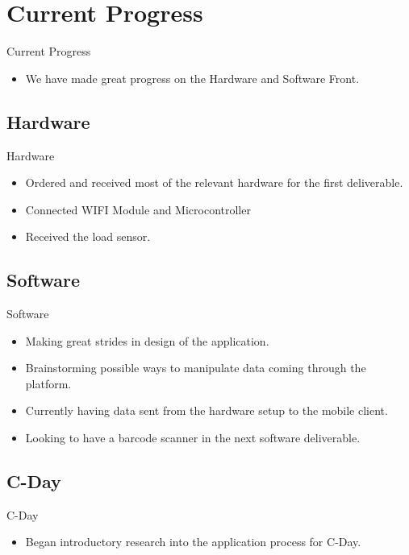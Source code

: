 \documentclass{beamer}
\begin{document}
\section{Current Progress}
\begin{frame}{Current Progress}
\begin{itemize}
	\item<1-> We have made great progress on the Hardware and Software Front.\pause
\end{itemize}
\end{frame}
\subsection{Hardware}
\begin{frame}{Hardware}
\begin{itemize}
	\item<1-> Ordered and received most of the relevant hardware for the first deliverable.\pause
	\item<2-> Connected WIFI Module and Microcontroller\pause
	\item<3-> Received the load sensor.\pause
\end{itemize}
\end{frame}
\subsection{Software}
\begin{frame}{Software}
\begin{itemize}
	\item<1-> Making great strides in design of the application. \pause
	\item<2-> Brainstorming possible ways to manipulate data coming through the platform. \pause
	\item<3-> Currently having data sent from the hardware setup to the mobile client.  \pause
	\item<4-> Looking to have a barcode scanner in the next software deliverable. 
\end{itemize}
\end{frame}
\subsection{C-Day}
\begin{frame}{C-Day}
\begin{itemize}
	\item<1-> Began introductory research into the application process for C-Day. 
\end{itemize}
\end{frame}
\end{document}
